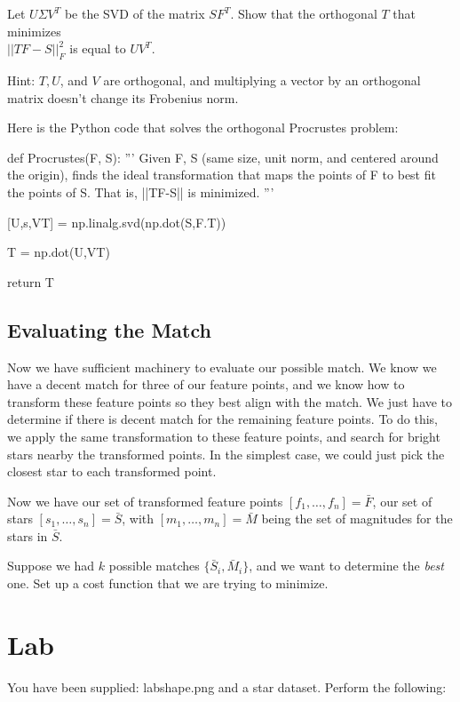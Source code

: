 \documentclass[paper=a4, fontsize=11pt]{scrartcl} %
\begin{document}
Let $U\Sigma V^T$ be the SVD of the matrix $SF^T$. Show that the orthogonal $T$ that minimizes\\ $||TF-S||^2_F$ is equal to $UV^T$.

Hint: $T,U$, and $V$ are orthogonal, and multiplying a vector by an orthogonal matrix doesn't change its Frobenius norm.

Here is the Python code that solves the orthogonal Procrustes problem:

\begin{python}
def Procrustes(F, S):
	'''
	Given F, S (same size, unit norm, and centered around the origin), finds the
	ideal transformation that maps the points of F to best fit the points of S.
	That is, ||TF-S|| is minimized.
	'''
	
	[U,s,VT] = np.linalg.svd(np.dot(S,F.T))
	
	T = np.dot(U,VT)
	
	return T
\end{python}

\subsection{Evaluating the Match}

Now we have sufficient machinery to evaluate our possible match.  We know we have a decent match for three of our feature points, and we know how to transform these feature points so they best align with the match. We just have to determine if there is decent match for the remaining feature points. To do this, we apply the same transformation to these feature points, and search for bright stars nearby the transformed points. In the simplest case, we could just pick the closest star to each transformed point.

Now we have our set of transformed feature points $[f_1,\ldots,f_n]=\bar{F}$, our set of stars $[s_1,\ldots,s_n] = \bar{S}$, with $[m_1,\ldots,m_n] = \bar{M}$ being the set of magnitudes for the stars in $\bar{S}$.

Suppose we had $k$ possible matches $\{\bar{S}_i,\bar{M}_i\}$, and we want to determine the \textit{best} one. Set up a cost function that we are trying to minimize.


\section{Lab}
You have been supplied: labshape.png and a star dataset. Perform the following: 
\end{document}
